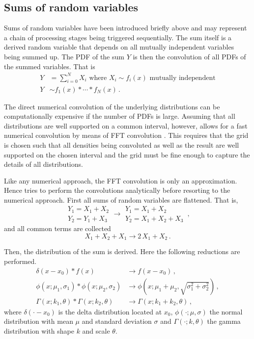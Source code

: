 \subsection{Sums of random variables}
Sums of random variables have been introduced briefly above and may represent a chain of processing
stages being triggered sequentially. The sum itself is a derived random variable that depends on all
mutually independent variables being summed up. The PDF of the sum $Y$ is then the convolution of all
PDFs of the summed variables. That is
\begin{align}
 Y &= \sum_{i=0}^NX_i\text{ where } X_i \sim f_i(x)\text{ mutually independent} \nonumber \\
 Y &\sim f_1(x) \ast \cdots \ast f_N(x)\,. \nonumber
\end{align}

The direct numerical convolution of the underlying distributions can be computationally expensive if the
number of PDFs is large. Assuming that all distributions are well supported on a common interval, however, 
allows for a fast numerical convolution by means of FFT convolution \cite[e.g., ][]{Press2007}. 
This requires that the grid is chosen such that all densities being convoluted as well as the
result are well supported on the chosen interval and the grid must be fine enough to
capture the details of all distributions. 

Like any numerical approach, the FFT convolution is only an approximation. Hence 
tries to perform the convolutions analytically before resorting to the numerical approach. First
all sums of random variables are flattened. That is, 
\begin{equation}
 \begin{array}{l}
  Y_1 = X_1 + X_2\\
  Y_2 = Y_1 + X_3 
 \end{array} \longrightarrow 
 \begin{array}{l}
  Y_1 = X_1 + X_2\\
  Y_2 = X_1 + X_2 + X_3 
 \end{array}\,, \nonumber
\end{equation}
and all common terms are collected
\begin{equation}
 X_1+X_2+X_1 \longrightarrow 2\,X_1+X_2\,. \nonumber
\end{equation}

Then, the distribution of the sum is derived. Here the following reductions are performed.
\begin{align}
 \delta(x-x_0)\ast f(x) &\longrightarrow f(x-x_0)\,, \nonumber \\
 \phi(x; \mu_1, \sigma_1)\ast \phi(x; \mu_2, \sigma_2) &\longrightarrow 
   \phi(x; \mu_1+\mu_2, \sqrt{\sigma_1^2+\sigma_2^2}) \nonumber\,, \\
 \Gamma(x; k_1, \theta)\ast \Gamma(x; k_2, \theta) &\longrightarrow 
   \Gamma(x; k_1+k_2, \theta)\,, \nonumber
\end{align}
where $\delta(\cdot-x_0)$ is the delta distribution located at $x_0$, $\phi(\cdot; \mu, \sigma)$ 
the normal distribution with mean $\mu$ and standard deviation $\sigma$ and 
$\Gamma(\cdot; k, \theta)$ the gamma distribution with shape $k$ and scale $\theta$.

